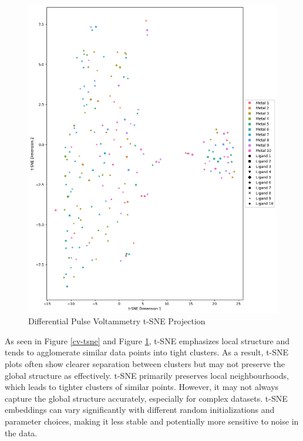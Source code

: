 \begin{figure}[h!]
  \centering
    \includegraphics[width=1.0\textwidth]{figures/dpv_tsne.png}
    \caption{Differential Pulse Voltammetry t-SNE Projection}
    \label{dpv-tsne}
\end{figure}
As seen in Figure \ref{cv-tsne} and Figure \ref{dpv-tsne}, t-SNE emphasizes local structure and tends to agglomerate similar data points into tight clusters. As a result, t-SNE plots often show clearer separation between clusters but may not preserve the global structure as effectively. t-SNE primarily preserves local neighbourhoods, which leads to tighter clusters of similar points. However, it may not always capture the global structure accurately, especially for complex datasets. t-SNE embeddings can vary significantly with different random initializations and parameter choices, making it less stable and potentially more sensitive to noise in the data. 

